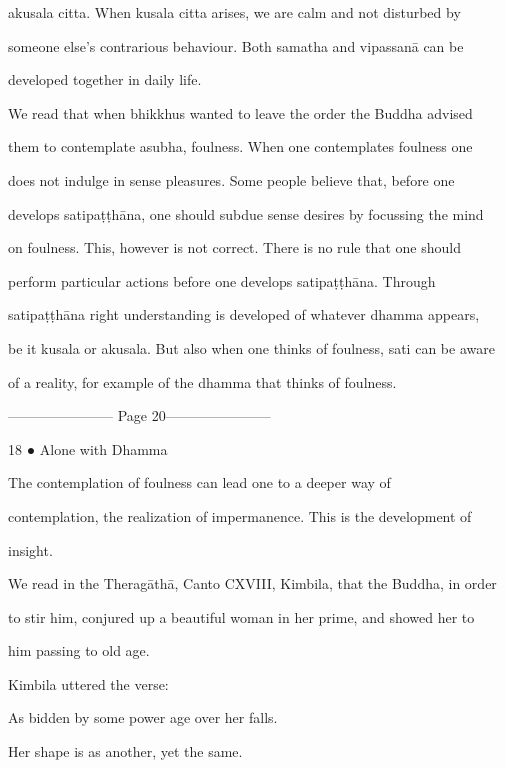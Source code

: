 akusala  citta.  When  kusala   citta  arises,  we  are  calm  and  not  disturbed  by  

someone  else’s   contrarious  behaviour.   Both  samatha  and  vipassanā   can  be  

developed together in daily life. 



We  read that when bhikkhus wanted to leave the  order the  Buddha  advised  

them to  contemplate  asubha, foulness. When  one  contemplates  foulness  one  

does  not  indulge  in  sense  pleasures.  Some  people  believe   that,  before   one  

develops satipaṭṭhāna, one should subdue sense desires by focussing the mind  

on  foulness.  This,  however  is  not  correct.  There  is  no  rule  that  one  should  

perform   particular   actions   before   one   develops   satipaṭṭhāna.   Through  

satipaṭṭhāna right understanding  is  developed of whatever dhamma  appears,  

be it kusala or akusala. But also when one thinks of foulness, sati can be aware  

of a reality, for example of the dhamma that thinks of foulness. 


----------------------- Page 20-----------------------

18 ● Alone with Dhamma 



   The   contemplation   of   foulness   can   lead   one   to   a   deeper   way   of  

contemplation,  the  realization  of  impermanence.  This  is  the  development  of  

insight. 



We read in the Theragāthā, Canto CXVIII, Kimbila, that the Buddha, in order  

to stir him, conjured up  a beautiful woman in her prime, and showed her to  

him passing to old age. 

   Kimbila uttered the verse: 



      As bidden by some power age over her falls. 

      Her shape is as another, yet the same. 

